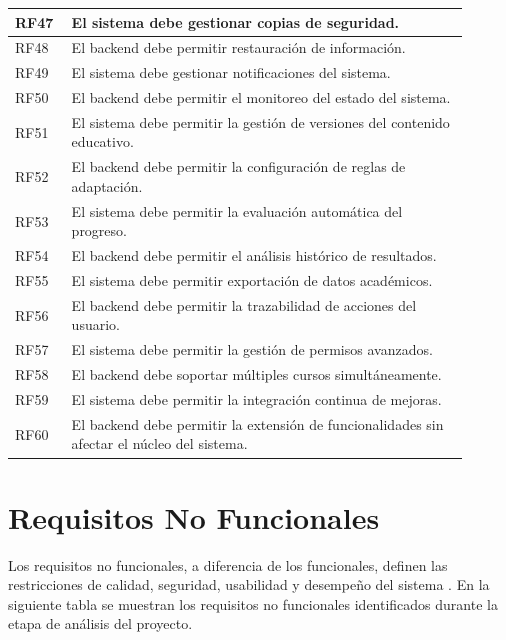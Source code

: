 \begin{longtable}{|p{0.1\linewidth}|p{0.8\linewidth}|}
\hline
RF47 & El sistema debe gestionar copias de seguridad. \\
\hline
RF48 & El backend debe permitir restauración de información. \\
\hline
RF49 & El sistema debe gestionar notificaciones del sistema. \\
\hline
RF50 & El backend debe permitir el monitoreo del estado del sistema. \\
\hline
RF51 & El sistema debe permitir la gestión de versiones del contenido educativo. \\
\hline
RF52 & El backend debe permitir la configuración de reglas de adaptación. \\
\hline
RF53 & El sistema debe permitir la evaluación automática del progreso. \\
\hline
RF54 & El backend debe permitir el análisis histórico de resultados. \\
\hline
RF55 & El sistema debe permitir exportación de datos académicos. \\
\hline
RF56 & El backend debe permitir la trazabilidad de acciones del usuario. \\
\hline
RF57 & El sistema debe permitir la gestión de permisos avanzados. \\
\hline
RF58 & El backend debe soportar múltiples cursos simultáneamente. \\
\hline
RF59 & El sistema debe permitir la integración continua de mejoras. \\
\hline
RF60 & El backend debe permitir la extensión de funcionalidades sin afectar el núcleo del sistema. \\
\hline

\end{longtable}



\section{Requisitos No Funcionales}

Los requisitos no funcionales, a diferencia de los funcionales, definen las restricciones de calidad, seguridad, usabilidad y desempeño del sistema  \cite{sommerville_software_2011,pressman_ingenierisoftware_2013}. En la siguiente tabla se muestran los requisitos no funcionales identificados durante la etapa de análisis del proyecto.


